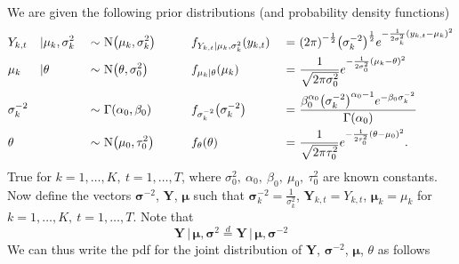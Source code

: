 \documentclass[11pt]{article} %
\let\originalleft\left
\let\originalright\right
\renewcommand{\left}{\mathopen{}\mathclose\bgroup\originalleft}
\renewcommand{\right}{\aftergroup\egroup\originalright}
\begin{document}
We are given the following prior distributions (and probability density functions)
\begin{alignat*}{5}
	& Y_{k,t} &\vert& \mu_k, \sigma_{k}^2 &\  \sim \ &  \mbox{N}\left(\mu_{k}, \sigma_{k}^{2}\right) &\qquad& f_{Y_{k,t} \vert \mu_k, \sigma_{k}^2}\left(y_{k, t}\right)&\ =\ &\left(2\pi\right)^{-\frac{1}{2}}\left(\sigma_k^{-2}\right)^{\frac{1}{2}}e^{-\frac{1}{2\sigma_k^{2}}\left(y_{k, t} - \mu_k\right)^2}\\
	& \mu_k&\vert& \theta &\  \sim \ & \mbox{N}\left(\theta, \sigma_{0}^{2}\right) &\qquad& f_{\mu_k\vert \theta}\left(\mu_{k}\right)&\ =\ &\frac{1}{\sqrt{2\pi\sigma_0^2}}e^{-\frac{1}{2\sigma_0^{2}}\left(\mu_{k} - \theta\right)^2}\\
	& \sigma_{k}^{-2} && &\  \sim \ & \Gamma\left(\alpha_0, \beta_0\right) &\qquad& f_{\sigma_{k}^{-2}}\left(\sigma_{k}^{-2}\right) &\ =\ & \frac{\beta_0^{\alpha_0}{\left(\sigma_{k}^{-2}\right)}^{\alpha_0 - 1}e^{-\beta_0{\sigma_{k}^{-2}}}}{\Gamma\left(\alpha_0\right)}\\
	& \theta && &\  \sim \ & \mbox{N}\left(\mu_0, \tau_{0}^{2}\right) &\qquad& f_{\theta}\left(\theta\right) &\ =\ &\frac{1}{\sqrt{2\pi\tau_0^2}}e^{-\frac{1}{2\tau_0^{2}}\left(\theta - \mu_{0}\right)^2}
.\end{alignat*}
True for $k = 1, \ldots, K,\  t=1, \ldots, T$, where $\sigma_0^2,\ \alpha_0,\ \beta_0,\ \mu_0,\ \tau_0^2$ are known constants. Now define the vectors $\boldsymbol{\sigma}^{-2}$, $\mathbf{Y}$, $\boldsymbol{\mu}$ such that $\boldsymbol{\sigma}^{-2}_{k} = \frac{1}{\sigma_{k}^{2}}$, $\mathbf{Y}_{k, t} = Y_{k,t}$, $\boldsymbol{\mu}_k = \mu_k$ for $k = 1, \ldots, K,\  t=1, \ldots, T$. Note that 
$$ \mathbf{Y}\,\vert\, \boldsymbol{\mu} , \boldsymbol{\sigma}^2 \overset{d}{=} \mathbf{Y}\,\vert\,\boldsymbol{\mu} , \boldsymbol{\sigma}^{-2} $$
We can thus write the pdf for the joint distribution of $\mathbf{Y}$, $\boldsymbol{\sigma}^{-2}$, $\boldsymbol{\mu}$, $\theta$ as follows
\end{document}
